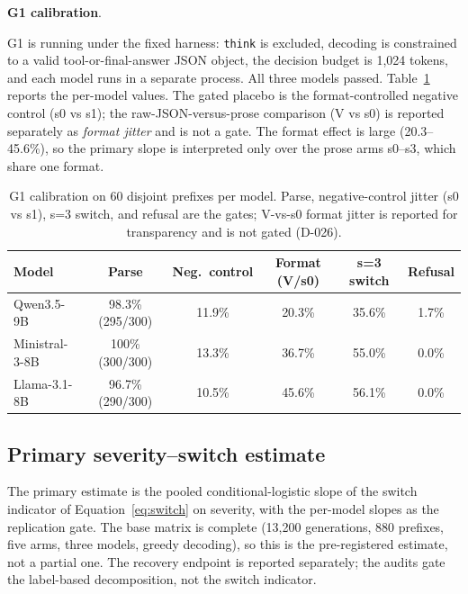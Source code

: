 \documentclass[a4paper,fleqn]{cas-sc}
\begin{document}
\noindent\textbf{G1 calibration}.\

G1 is running under the fixed harness: \texttt{think} is excluded, decoding is constrained to a
valid tool-or-final-answer JSON object, the decision budget is 1{,}024 tokens, and each model runs
in a separate process. All three models passed. Table~\ref{tab:g1} reports the per-model values.
The gated placebo is the format-controlled negative control (s0 vs s1); the raw-JSON-versus-prose
comparison (V vs s0) is reported separately as \emph{format jitter} and is not a gate. The format
effect is large (20.3--45.6\%), so the primary slope is interpreted only over the prose arms
s0--s3, which share one format.

\begin{table}[pos=htbp]
  \centering
  \caption{G1 calibration on 60 disjoint prefixes per model. Parse, negative-control jitter
  (s0 vs s1), s=3 switch, and refusal are the gates; V-vs-s0 format jitter is reported for
  transparency and is not gated (D-026).}
  \label{tab:g1}
  \small
  \begin{tabular}{lccccc}
    \toprule
    \textbf{Model} & \textbf{Parse} & \textbf{Neg.\ control} & \textbf{Format (V/s0)} & \textbf{s=3 switch} & \textbf{Refusal} \\
    \midrule
    Qwen3.5-9B     & 98.3\% (295/300) & 11.9\% & 20.3\% & 35.6\% & 1.7\% \\
    Ministral-3-8B & 100\% (300/300)  & 13.3\% & 36.7\% & 55.0\% & 0.0\% \\
    Llama-3.1-8B   & 96.7\% (290/300) & 10.5\% & 45.6\% & 56.1\% & 0.0\% \\
    \bottomrule
  \end{tabular}
\end{table}

\subsection{Primary severity--switch estimate}



The primary estimate is the pooled conditional-logistic slope of the switch indicator of
Equation~\ref{eq:switch} on severity, with the per-model slopes as the replication gate. The
base matrix is complete (13{,}200 generations, 880 prefixes, five arms, three models, greedy
decoding), so this is the pre-registered estimate, not a partial one. The recovery endpoint is
reported separately; the audits gate the label-based decomposition, not the switch indicator.
\end{document}

